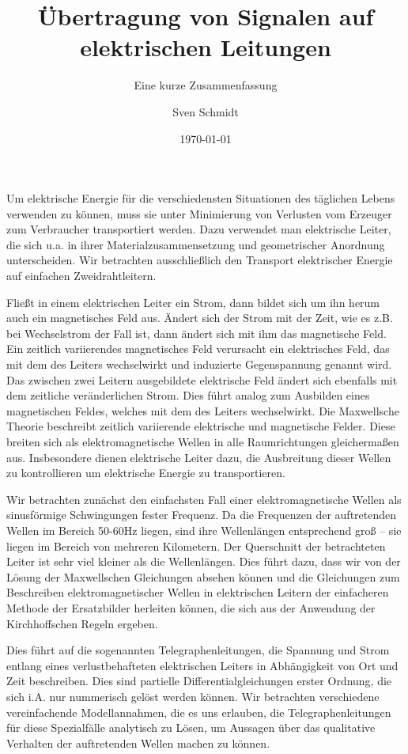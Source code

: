 \documentclass[12pt,ngerman,parkskip=half-]{scrreprt}
\title{Übertragung von Signalen auf elektrischen Leitungen}
\subtitle{Eine kurze Zusammenfassung}
\author{Sven Schmidt}
\date{\today}
\begin{document}
\maketitle

Um elektrische Energie für die verschiedensten Situationen des täglichen Lebens verwenden zu können, muss sie unter Minimierung von Verlusten vom Erzeuger zum Verbraucher transportiert werden. Dazu verwendet man elektrische Leiter, die sich u.a. in ihrer Materialzusammensetzung und geometrischer Anordnung unterscheiden.
Wir betrachten ausschließlich den Transport elektrischer Energie auf einfachen Zweidrahtleitern.

Fließt in einem elektrischen Leiter ein Strom, dann bildet sich um ihn herum auch ein magnetisches Feld aus. Ändert sich der Strom mit der Zeit, wie es z.B. bei Wechselstrom der Fall ist, dann ändert sich mit ihm das magnetische Feld. Ein zeitlich variierendes magnetisches Feld verursacht ein elektrisches Feld, das mit dem des Leiters wechselwirkt und induzierte Gegenspannung genannt wird. Das zwischen zwei Leitern ausgebildete elektrische Feld ändert sich ebenfalls mit dem zeitliche veränderlichen Strom. Dies führt analog zum Ausbilden eines magnetischen Feldes, welches mit dem des Leiters wechselwirkt. Die Maxwellsche Theorie beschreibt zeitlich variierende elektrische und magnetische Felder. Diese breiten sich als elektromagnetische Wellen in alle Raumrichtungen gleichermaßen aus. Insbesondere dienen elektrische Leiter dazu, die Ausbreitung dieser Wellen zu kontrollieren um elektrische Energie zu transportieren.

Wir betrachten zunächst den einfachsten Fall einer elektromagnetische Wellen als sinusförmige Schwingungen fester Frequenz. Da die Frequenzen der auftretenden Wellen im Bereich 50-60Hz liegen, sind ihre Wellenlängen entsprechend groß -- sie liegen im Bereich von mehreren Kilometern. Der Querschnitt der betrachteten Leiter ist sehr viel kleiner als die Wellenlängen. Dies führt dazu, dass wir von der Lösung der Maxwellschen Gleichungen absehen können und die Gleichungen zum Beschreiben elektromagnetischer Wellen in elektrischen Leitern der einfacheren Methode der Ersatzbilder herleiten können, die sich aus der Anwendung der Kirchhoffschen Regeln ergeben.

Dies führt auf die sogenannten Telegraphenleitungen, die Spannung und Strom entlang eines verlustbehafteten elektrischen Leiters in Abhängigkeit von Ort und Zeit beschreiben. Dies sind partielle Differentialgleichungen erster Ordnung, die sich i.A. nur nummerisch gelöst werden können. Wir betrachten verschiedene vereinfachende Modellannahmen, die es uns erlauben, die Telegraphenleitungen für diese Spezialfälle analytisch zu Lösen, um Aussagen über das qualitative Verhalten der auftretenden Wellen machen zu können.
\end{document}
